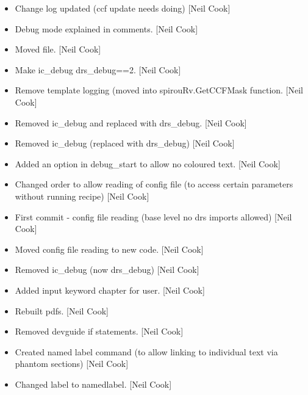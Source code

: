 \documentclass[a4paper,10pt,english]{report}
\begin{document}
\begin{itemize}
\item {} 
Change log updated (ccf update needs doing) {[}Neil Cook{]}

\item {} 
Debug mode explained in comments. {[}Neil Cook{]}

\item {} 
Moved file. {[}Neil Cook{]}

\item {} 
Make ic\_debug drs\_debug==2. {[}Neil Cook{]}

\item {} 
Remove template logging (moved into spirouRv.GetCCFMask function.
{[}Neil Cook{]}

\item {} 
Removed ic\_debug and replaced with drs\_debug. {[}Neil Cook{]}

\item {} 
Removed ic\_debug (replaced with drs\_debug) {[}Neil Cook{]}

\item {} 
Added an option in debug\_start to allow no coloured text. {[}Neil Cook{]}

\item {} 
Changed order to allow reading of config file (to access certain
parameters without running recipe) {[}Neil Cook{]}

\item {} 
First commit - config file reading (base level no drs imports allowed)
{[}Neil Cook{]}

\item {} 
Moved config file reading to new code. {[}Neil Cook{]}

\item {} 
Removed ic\_debug (now drs\_debug) {[}Neil Cook{]}

\item {} 
Added input keyword chapter for user. {[}Neil Cook{]}

\item {} 
Rebuilt pdfs. {[}Neil Cook{]}

\item {} 
Removed devguide if statements. {[}Neil Cook{]}

\item {} 
Created named label command (to allow linking to individual text via
phantom sections) {[}Neil Cook{]}

\item {} 
Changed label to namedlabel. {[}Neil Cook{]}


\end{itemize}
\end{document}
